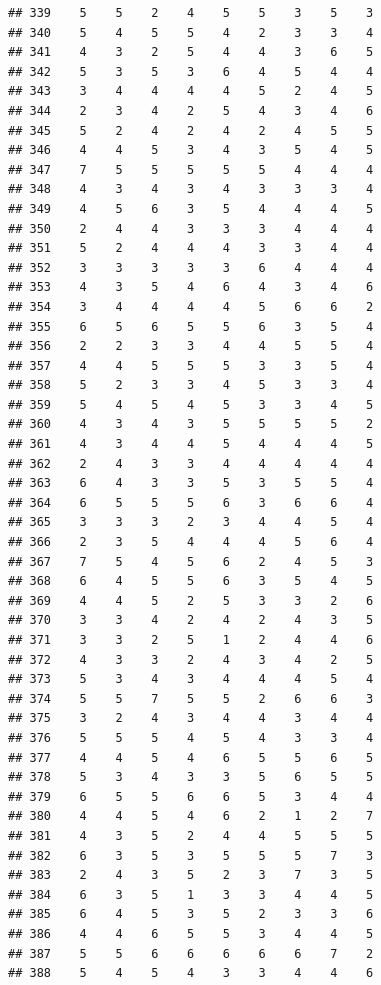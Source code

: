 \documentclass[
]{article}
\begin{document}
\begin{verbatim}
## 339    5    5    2    4    5    5    3    5    3
## 340    5    4    5    5    4    2    3    3    4
## 341    4    3    2    5    4    4    3    6    5
## 342    5    3    5    3    6    4    5    4    4
## 343    3    4    4    4    4    5    2    4    5
## 344    2    3    4    2    5    4    3    4    6
## 345    5    2    4    2    4    2    4    5    5
## 346    4    4    5    3    4    3    5    4    5
## 347    7    5    5    5    5    5    4    4    4
## 348    4    3    4    3    4    3    3    3    4
## 349    4    5    6    3    5    4    4    4    5
## 350    2    4    4    3    3    3    4    4    4
## 351    5    2    4    4    4    3    3    4    4
## 352    3    3    3    3    3    6    4    4    4
## 353    4    3    5    4    6    4    3    4    6
## 354    3    4    4    4    4    5    6    6    2
## 355    6    5    6    5    5    6    3    5    4
## 356    2    2    3    3    4    4    5    5    4
## 357    4    4    5    5    5    3    3    5    4
## 358    5    2    3    3    4    5    3    3    4
## 359    5    4    5    4    5    3    3    4    5
## 360    4    3    4    3    5    5    5    5    2
## 361    4    3    4    4    5    4    4    4    5
## 362    2    4    3    3    4    4    4    4    4
## 363    6    4    3    3    5    3    5    5    4
## 364    6    5    5    5    6    3    6    6    4
## 365    3    3    3    2    3    4    4    5    4
## 366    2    3    5    4    4    4    5    6    4
## 367    7    5    4    5    6    2    4    5    3
## 368    6    4    5    5    6    3    5    4    5
## 369    4    4    5    2    5    3    3    2    6
## 370    3    3    4    2    4    2    4    3    5
## 371    3    3    2    5    1    2    4    4    6
## 372    4    3    3    2    4    3    4    2    5
## 373    5    3    4    3    4    4    4    5    4
## 374    5    5    7    5    5    2    6    6    3
## 375    3    2    4    3    4    4    3    4    4
## 376    5    5    5    4    5    4    3    3    4
## 377    4    4    5    4    6    5    5    6    5
## 378    5    3    4    3    3    5    6    5    5
## 379    6    5    5    6    6    5    3    4    4
## 380    4    4    5    4    6    2    1    2    7
## 381    4    3    5    2    4    4    5    5    5
## 382    6    3    5    3    5    5    5    7    3
## 383    2    4    3    5    2    3    7    3    5
## 384    6    3    5    1    3    3    4    4    5
## 385    6    4    5    3    5    2    3    3    6
## 386    4    4    6    5    5    3    4    4    5
## 387    5    5    6    6    6    6    6    7    2
## 388    5    4    5    4    3    3    4    4    6

\end{verbatim}
\end{document}
